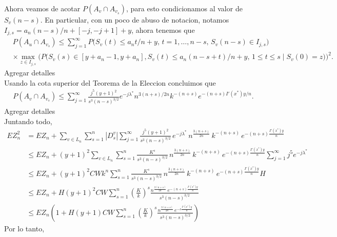 \documentclass[12pt]{report}
\begin{document}
Ahora veamos de acotar $P(A_v \cap A_{v_s})$, para esto condicionamos al valor de $S_v (n-s)$. 
En particular, con un poco de abuso de notacion, notamos $I_{j,s} = a_n (n-s)/n + [-j,-j+1] + y$, ahora tenemos que
\begin{align}
&P(A_u \cap A_{v_s}) \leq \sum_{j=1}^{\infty} P\Big(S_v(t) \leq a_n t/n + y,\, t = 1, \ldots, n - s,\, S_v(n - s) \in I_{j,s}\Big) \nonumber \\
&\times \max_{z \in I_{j,s}} \Big(P\big(S_v(s) \in [y + a_n - 1, y + a_n],
S_v(t) \leq a_n(n - s + t)/n + y,\, 1 \leq t \leq s \mid S_v(0) = z\big)\Big)^2. \nonumber
\end{align}
Agregar detalles \\
Usando la cota superior del Teorema de la Eleccion concluimos que
\begin{align}
    P(A_v \cap A_{v_s}) \leq \sum_{j=1}^{\infty} 
\frac{j^5 (y + 1)^2}{s^3 (n - s)^{3/2}} 
e^{-j \lambda^*} 
n^{3(n + s)/2n} 
k^{-(n + s)} 
e^{-(n + s) I'(x^*) y / n}.
\end{align}
Agregar detalles\\

Juntando todo,
\begin{align*}
    EZ_n^2
    &= EZ_n + \sum_{v \in L_n} \sum_{s = 1}^{n} |D_s^v| \sum_{j=1}^{\infty} 
    \frac{j^5 (y + 1)^2}{s^3 (n - s)^{3/2}} \, e^{-j \lambda^*} \, n^{\frac{3(n + s)}{2n}} \, k^{-(n + s)} \, e^{-(n + s) \frac{I'(x^*) y}{n}} \\
    &\leq EZ_n + (y + 1)^2 \sum_{v \in L_n} \sum_{s = 1}^{n} \frac{K^s}{s^3 (n - s)^{3/2}} \, n^{\frac{3(n + s)}{2n}} \, k^{-(n + s)} \, e^{-(n + s) \frac{I'(x^*) y}{n}} \sum_{j=1}^{\infty} j^5 e^{-j \lambda^*} \\
    &\leq EZ_n + (y + 1)^2 C W k^n \sum_{s = 1}^{n} \frac{K^s}{s^3 (n - s)^{3/2}} \, n^{\frac{3(n + s)}{2n}} \, k^{-(n + s)} \, e^{-(n + s) \frac{I'(x^*) y}{n}} H \\
    &\leq EZ_n + H (y + 1)^2 C W \sum_{s = 1}^{n} \left(\frac{K}{k}\right)^s \frac{n^{\frac{3(n + s)}{2n}} \, e^{-(n + s) \frac{I'(x^*) y}{n}}}{s^3 (n - s)^{3/2}} \\
    &\leq EZ_n \left( 1 + H (y + 1) C W \sum_{s = 1}^{n} \left(\frac{K}{k}\right)^s \frac{n^{\frac{3(n + s)}{2n}} \, e^{-s \frac{I'(x^*) y}{n}}}{s^3 (n - s)^{3/2}} \right)
\end{align*}
 Por lo tanto,
\end{document}
